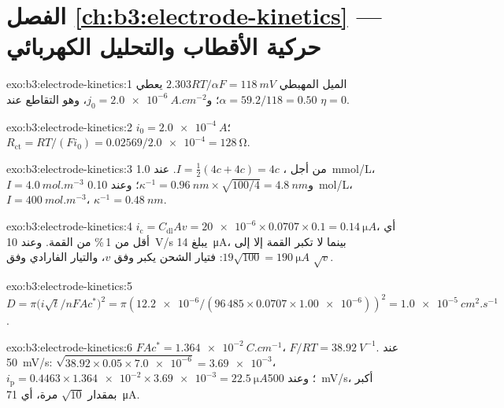\section*{الفصل \ref{ch:b3:electrode-kinetics} --- حركية الأقطاب والتحليل الكهربائي}

\begin{solution}{exo:b3:electrode-kinetics:1}
الميل المهبطي $2.303RT/\alpha F = \qty{118}{mV}$ يعطي $\alpha = 59.2/118 = 0.50$؛ و$j_0 = \qty{2.0e-6}{A.cm^{-2}}$،
وهو التقاطع عند $\eta = 0$.
\end{solution}

\begin{solution}{exo:b3:electrode-kinetics:2}
$i_0 = \qty{2.0e-4}{A}$؛ $R_{\mathrm{ct}} = RT/(Fi_0) = 0.02569/\num{2.0e-4} = \qty{128}{\ohm}$.
\end{solution}

\begin{solution}{exo:b3:electrode-kinetics:3}
من أجل ، $I = \frac12(4c + 4c) = 4c$. عند \qty{1.0}{mmol/L}، $I = \qty{4.0}{mol.m^{-3}}$ و$\kappa^{-1} =
\qty{0.96}{nm} \times \sqrt{100/4} = \qty{4.8}{nm}$؛ وعند \qty{0.10}{mol/L}، $I = \qty{400}{mol.m^{-3}}$، $\kappa^{-1} = \qty{0.48}{nm}$.
\end{solution}

\begin{solution}{exo:b3:electrode-kinetics:4}
$i_{\mathrm c} = C_{\mathrm{dl}}Av = \num{20e-6} \times 0.0707 \times 0.1 = \qty{0.14}{\micro A}$، أي أقل من 1\,\% من القمة. وعند
\qty{10}{V/s} يبلغ \qty{14}{\micro A}، بينما لا تكبر القمة إلا إلى $19\sqrt{100} = \qty{190}{\micro A}$:
فتيار الشحن يكبر وفق $v$، والتيار الفارادي وفق $\sqrt v$.
\end{solution}

\begin{solution}{exo:b3:electrode-kinetics:5}
$D = \pi\bigl(i\sqrt t/nFAc^*\bigr)^2 = \pi(\num{12.2e-6}/(96\,485 \times 0.0707 \times \num{1.00e-6}))^2 =
\qty{1.0e-5}{cm^2.s^{-1}}$.
\end{solution}

\begin{solution}{exo:b3:electrode-kinetics:6}
$FAc^* = \qty{1.364e-2}{C.cm^{-1}}$، $F/RT = \qty{38.92}{V^{-1}}$. عند \qty{50}{mV/s}: $\sqrt{38.92 \times 0.05 \times \num{7.0e-6}} =
\num{3.69e-3}$، $i_{\mathrm p} = 0.4463 \times \num{1.364e-2} \times \num{3.69e-3} = \qty{22.5}{\micro A}$؛ وعند \qty{500}{mV/s}، أكبر بمقدار $\sqrt{10}$
مرة، أي \qty{71}{\micro A}.
\end{solution}

